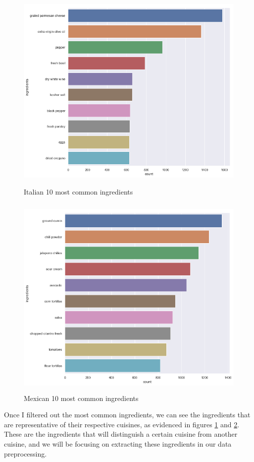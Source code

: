 \documentclass[12pt]{article}
\begin{document}
\begin{figure}
\includegraphics[width=\textwidth, height=10cm]{italian-most-common-ingredients.png}
\caption{Italian 10 most common ingredients}
\label{fig: italian-most-common-ingredients}
\end{figure}

\begin{figure}
\includegraphics[width=\textwidth, height=10cm]{mexican-most-common-ingredients.png}
\caption{Mexican 10 most common ingredients}
\label{fig: mexican-most-common-ingredients}
\end{figure}

Once I filtered out the most common ingredients, we can see the ingredients that are representative of their respective cuisines, as evidenced in figures \ref{fig: italian-most-common-ingredients} and \ref{fig: mexican-most-common-ingredients}. These are the ingredients that will distinguish a certain cuisine from another cuisine, and we will be focusing on extracting these ingredients in our data preprocessing.
\end{document}
